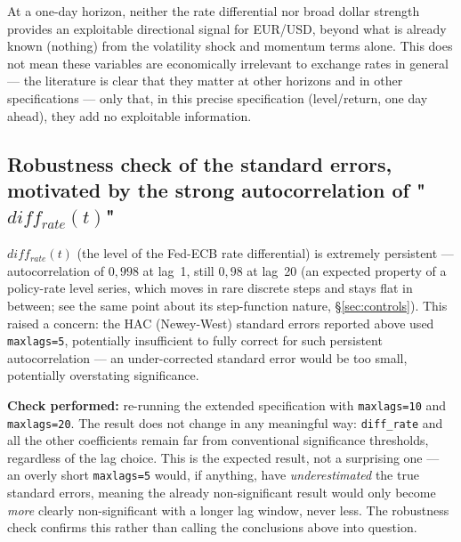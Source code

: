 \documentclass[12pt,a4paper]{article}
\begin{document}
\vspace{0.8cm}

\begin{econbox}
	At a one-day horizon, neither the rate differential nor
	broad dollar strength provides an exploitable directional signal for
	EUR/USD, beyond what is already known (nothing) from the volatility
	shock and momentum terms alone. This does not mean
	these variables are economically irrelevant to exchange rates
	in general --- the literature is clear that they matter at
	other horizons and in other specifications --- only that,
	in this precise specification (level/return, one day
	ahead), they add no exploitable information.
\end{econbox}

\newpage

\subsection{Robustness check of the standard errors, motivated by the strong autocorrelation of "$diff_{rate}(t)$"}

$diff_{rate}(t)$ (the level of the Fed-ECB rate differential) is
extremely persistent --- autocorrelation of $0{,}998$ at lag~1,
still $0{,}98$ at lag~20 (an expected property of a policy-rate
level series, which moves in rare discrete steps and stays
flat in between; see the same point about its step-function
nature, \S\ref{sec:controls}). This raised a concern: the
HAC (Newey-West) standard errors reported above used
\texttt{maxlags=5}, potentially insufficient to fully correct
for such persistent autocorrelation --- an under-corrected
standard error would be too small, potentially overstating
significance.

\textbf{Check performed:} re-running the extended
specification with \texttt{maxlags=10} and \texttt{maxlags=20}. The result does not
change in any meaningful way: \texttt{diff\_rate} and all the
other coefficients remain far from conventional
significance thresholds, regardless of the lag choice. This is the
expected result, not a surprising one --- an overly short
\texttt{maxlags=5} would, if anything, have \emph{underestimated} the
true standard errors, meaning the already non-significant result would only become
\emph{more} clearly non-significant with a longer lag
window, never less. The robustness check confirms this
rather than calling the conclusions above into question.

\newpage
\end{document}
